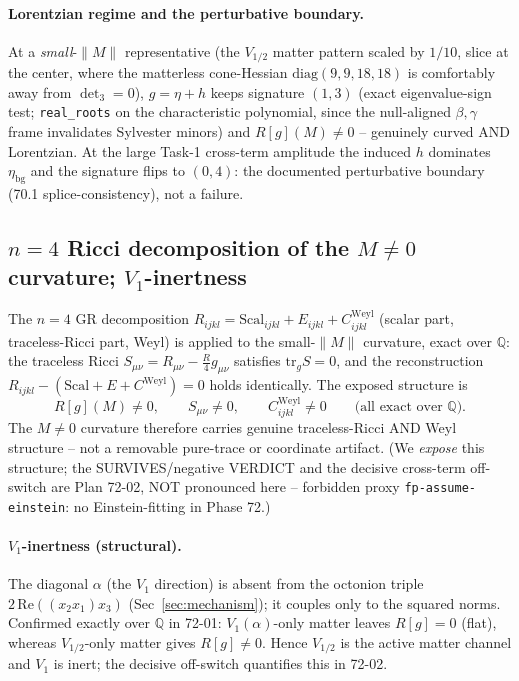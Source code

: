 \paragraph{Lorentzian regime and the perturbative boundary.} At a \emph{small}-$\|M\|$
representative (the $V_{1/2}$ matter pattern scaled by $1/10$, slice at the center,
where the matterless cone-Hessian $\mathrm{diag}(9,9,18,18)$ is comfortably away from
$\det_3=0$), $g=\eta+h$ keeps signature $(1,3)$ (exact eigenvalue-sign test;
\texttt{real\_roots} on the characteristic polynomial, since the null-aligned
$\beta,\gamma$ frame invalidates Sylvester minors) and $R[g](M)\neq0$ -- genuinely
curved AND Lorentzian. At the large Task-1 cross-term amplitude the induced $h$
dominates $\eta_{\mathrm{bg}}$ and the signature flips to $(0,4)$: the documented
perturbative boundary (70.1 splice-consistency), not a failure.

\subsection{$n=4$ Ricci decomposition of the $M\neq0$ curvature; $V_1$-inertness}
\label{sec:decomp}

The $n=4$ GR decomposition $R_{ijkl}=\mathrm{Scal}_{ijkl}+E_{ijkl}+C^{\mathrm{Weyl}}_{ijkl}$
(scalar part, traceless-Ricci part, Weyl) is applied to the small-$\|M\|$ curvature,
exact over $\mathbb{Q}$: the traceless Ricci $S_{\mu\nu}=R_{\mu\nu}-\tfrac{R}{4}g_{\mu\nu}$
satisfies $\mathrm{tr}_g S=0$, and the reconstruction
$R_{ijkl}-(\mathrm{Scal}+E+C^{\mathrm{Weyl}})=0$ holds identically. The exposed
structure is
\begin{equation}
  R[g](M)\neq0,\qquad S_{\mu\nu}\neq0,\qquad C^{\mathrm{Weyl}}_{ijkl}\neq0
  \qquad\text{(all exact over $\mathbb{Q}$).}
\end{equation}
The $M\neq0$ curvature therefore carries genuine traceless-Ricci AND Weyl structure --
not a removable pure-trace or coordinate artifact. (We \emph{expose} this structure;
the SURVIVES/negative VERDICT and the decisive cross-term off-switch are Plan 72-02,
NOT pronounced here -- forbidden proxy \texttt{fp-assume-einstein}: no Einstein-fitting
in Phase 72.)

\paragraph{$V_1$-inertness (structural).} The diagonal $\alpha$ (the $V_1$ direction)
is absent from the octonion triple $2\,\mathrm{Re}((x_2x_1)x_3)$
(Sec~\ref{sec:mechanism}); it couples only to the squared norms. Confirmed exactly
over $\mathbb{Q}$ in 72-01: $V_1(\alpha)$-only matter leaves $R[g]=0$ (flat), whereas
$V_{1/2}$-only matter gives $R[g]\neq0$. Hence $V_{1/2}$ is the active matter channel
and $V_1$ is inert; the decisive off-switch quantifies this in 72-02.

